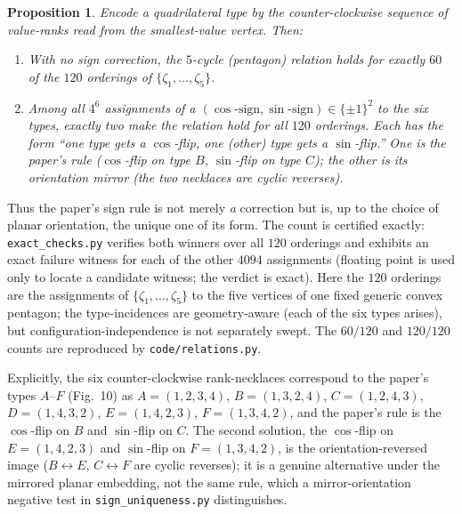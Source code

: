 \documentclass[11pt]{article}
\theoremstyle{plain}
\newtheorem{proposition}[theorem]{Proposition}
\theoremstyle{definition}
\theoremstyle{remark}
\begin{document}
\begin{proposition}\label{prop:signs}
Encode a quadrilateral type by the counter-clockwise sequence of value-ranks read from the
smallest-value vertex. Then:
\begin{enumerate}
\item[(a)] With no sign correction, the $5$-cycle (pentagon) relation holds for exactly $60$ of
the $120$ orderings of $\{\zeta_1,\dots,\zeta_5\}$.
\item[(b)] Among all $4^{6}$ assignments of a $(\cos\text{-sign},\sin\text{-sign})\in\{\pm1\}^2$ to
the six types, exactly two make the relation hold for all $120$ orderings. Each has the form
``one type gets a $\cos$-flip, one (other) type gets a $\sin$-flip.'' One is the paper's rule
($\cos$-flip on type $B$, $\sin$-flip on type $C$); the other is its orientation mirror (the two
necklaces are cyclic reverses).
\end{enumerate}
\end{proposition}
Thus the paper's sign rule is not merely \emph{a} correction but is, up to the choice of planar
orientation, the unique one of its form. The count is certified exactly: \texttt{exact\_checks.py}
verifies both winners over all $120$ orderings and exhibits an exact failure witness for each of the
other $4094$ assignments (floating point is used only to locate a candidate witness; the verdict is
exact). Here the $120$ orderings are the assignments of $\{\zeta_1,\dots,\zeta_5\}$ to the five vertices
of one fixed generic convex pentagon; the type-incidences are geometry-aware (each of the six types
arises), but configuration-independence is not separately swept. The $60/120$ and $120/120$ counts are reproduced by \texttt{code/relations.py}.

Explicitly, the six counter-clockwise rank-necklaces correspond to the paper's types $A$--$F$
(Fig.~10) as $A=(1,2,3,4)$, $B=(1,3,2,4)$, $C=(1,2,4,3)$, $D=(1,4,3,2)$, $E=(1,4,2,3)$,
$F=(1,3,4,2)$, and the paper's rule is the $\cos$-flip on $B$ and $\sin$-flip on $C$. The second
solution, the $\cos$-flip on $E=(1,4,2,3)$ and $\sin$-flip on $F=(1,3,4,2)$, is the
orientation-reversed image ($B\leftrightarrow E$, $C\leftrightarrow F$ are cyclic reverses); it is a
genuine alternative under the mirrored planar embedding, not the same rule, which a mirror-orientation
negative test in \texttt{sign\_uniqueness.py} distinguishes.
\end{document}
